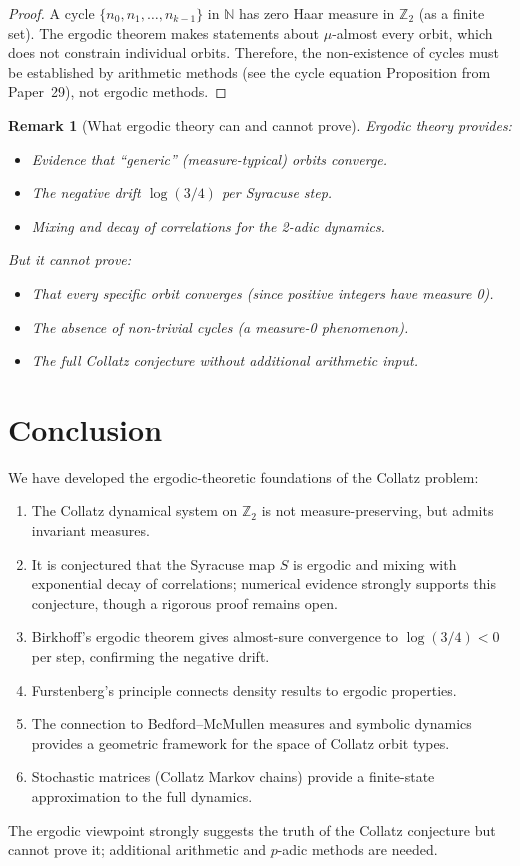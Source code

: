 \documentclass[12pt,a4paper]{article}
\newtheorem{remark}[theorem]{Remark}
\begin{document}
\begin{proof}
A cycle $\{n_0, n_1, \ldots, n_{k-1}\}$ in $\mathbb{N}$ has zero Haar measure in
$\mathbb{Z}_2$ (as a finite set). The ergodic theorem makes statements about $\mu$-almost
every orbit, which does not constrain individual orbits. Therefore, the non-existence of
cycles must be established by arithmetic methods (see the cycle equation
Proposition from Paper~29), not ergodic methods.
\end{proof}

\begin{remark}[What ergodic theory can and cannot prove]\label{rem:ergodic_limits}
Ergodic theory provides:
\begin{itemize}
  \item Evidence that ``generic'' (measure-typical) orbits converge.
  \item The negative drift $\log(3/4)$ per Syracuse step.
  \item Mixing and decay of correlations for the 2-adic dynamics.
\end{itemize}
But it cannot prove:
\begin{itemize}
  \item That every \emph{specific} orbit converges (since positive integers have measure 0).
  \item The absence of non-trivial cycles (a measure-0 phenomenon).
  \item The full Collatz conjecture without additional arithmetic input.
\end{itemize}
\end{remark}

\section{Conclusion}

We have developed the ergodic-theoretic foundations of the Collatz problem:
\begin{enumerate}
  \item The Collatz dynamical system on $\mathbb{Z}_2$ is not measure-preserving,
        but admits invariant measures.
  \item It is conjectured that the Syracuse map $S$ is ergodic and mixing with exponential decay of correlations; numerical evidence strongly supports this conjecture, though a rigorous proof remains open.
  \item Birkhoff's ergodic theorem gives almost-sure convergence to $\log(3/4) < 0$
        per step, confirming the negative drift.
  \item Furstenberg's principle connects density results to ergodic properties.
  \item The connection to Bedford--McMullen measures and symbolic dynamics provides
        a geometric framework for the space of Collatz orbit types.
  \item Stochastic matrices (Collatz Markov chains) provide a finite-state approximation
        to the full dynamics.
\end{enumerate}
The ergodic viewpoint strongly suggests the truth of the Collatz conjecture but cannot
prove it; additional arithmetic and $p$-adic methods are needed.
\end{document}

